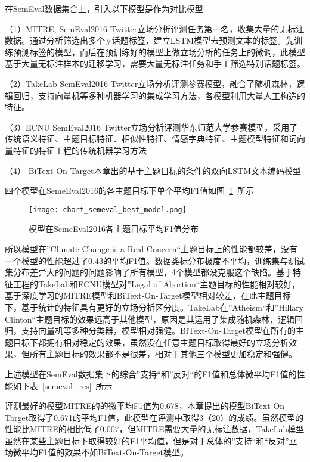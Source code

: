 在SemEval数据集合上，引入以下模型是作为对比模型

（1）MITRE, SemEval2016 Twitter立场分析评测任务第一名，收集大量的无标注数据。通过分析筛选出多个\#话题标签，建立LSTM模型去预测文本的标签。先训练预测标签的模型，而后在预训练好的模型上做立场分析的任务上的微调，此模型基于大量无标注样本的迁移学习，需要大量无标注任务和手工筛选特别话题标签。

（2）TakeLab   SemEval2016 Twitter立场分析评测参赛模型，融合了随机森林，逻辑回归，支持向量机等多种机器学习的集成学习方法，各模型利用大量人工构造的特征。

（3）ECNU  SemEval2016 Twitter立场分析评测华东师范大学参赛模型，采用了传统语义特征、主题目标特征、相似性特征、情感字典特征、主题模型特征和词向量特征的特征工程的传统机器学习方法

（4） BiText-On-Target本章出的基于主题目标的条件的双向LSTM文本编码模型

四个模型在SemeEval2016的各主题目标下单个平均F1值如图~\ref{chart_semeval_best_model}~所示
\begin{figure}[htbp]
	\centering
	\texttt{[image: chart\_semeval\_best\_model.png]}
	\caption[rnn_vanish]{模型在SemeEval2016各主题目标平均F1值分布}
	\label{chart_semeval_best_model}
\end{figure}
所以模型在”Climate Change is a Real Concern“主题目标上的性能都较差，没有一个模型的性能超过了0.43的平均F1值。数据类标分布极度不平均，训练集与测试集分布差异大的问题的问题影响了所有模型，4个模型都没克服这个缺陷。基于特征工程的TakeLab和ECNU模型对”Legal of Abortion“主题目标的性能相对较好，基于深度学习的MITRE模型和BiText-On-Target模型相对较差，在此主题目标下，基于统计的特征具有更好的立场分析区分度。TakeLab在”Atheism“和”Hillary Clinton“主题目标的效果远高于其他模型，原因是其运用了集成随机森林，逻辑回归，支持向量机等多种分类器，模型相对强健。BiText-On-Target模型在所有的主题目标下都拥有相对稳定的效果，虽然没在任意主题目标取得最好的立场分析效果，但所有主题目标的效果都不是很差，相对于其他三个模型更加稳定和强健。

上述模型在SemEval数据集下的综合”支持“和”反对“的F1值和总体微平均F1值的性能如下表~\ref{semeval_res}~所示

评测最好的模型MITRE的的微平均F1值为0.678，本章提出的模型BiText-On-Target取得了0.671的平均F1值，此模型在评测中取得3（20）的成绩。虽然模型的性能比MITRE的相比低了0.007，但MITRE需要大量的无标注数据，TakeLab模型虽然在某些主题目标下取得较好的F1平均值，但是对于总体的”支持“和“反对”立场微平均F1值的效果不如BiText-On-Target模型。

